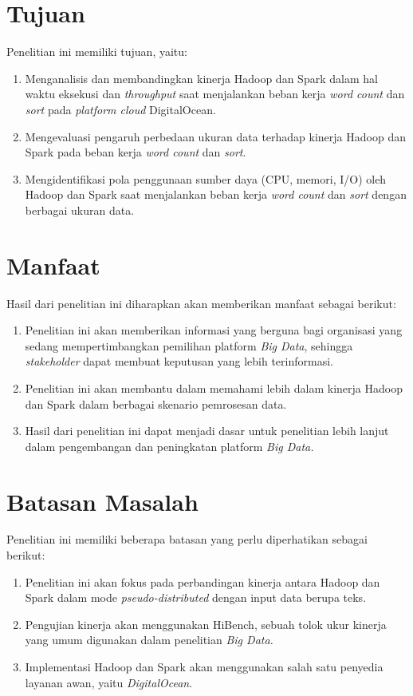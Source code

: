 \section{Tujuan}
Penelitian ini memiliki tujuan, yaitu:
\begin{enumerate}
\item Menganalisis dan membandingkan kinerja Hadoop dan Spark dalam hal waktu eksekusi dan \textit{throughput} saat menjalankan beban kerja \textit{word count} dan \textit{sort} pada \textit{platform cloud} DigitalOcean.
\item Mengevaluasi pengaruh perbedaan ukuran data terhadap kinerja Hadoop dan Spark pada beban kerja \textit{word count} dan \textit{sort}.
\item Mengidentifikasi pola penggunaan sumber daya (CPU, memori, I/O) oleh Hadoop dan Spark saat menjalankan beban kerja \textit{word count} dan \textit{sort} dengan berbagai ukuran data.
\end{enumerate}

\section{Manfaat}
Hasil dari penelitian ini diharapkan akan memberikan manfaat sebagai berikut:
\begin{enumerate}
	\item 
	Penelitian ini akan memberikan informasi yang berguna bagi organisasi yang sedang mempertimbangkan pemilihan platform \textit{Big Data}, sehingga \textit{stakeholder} dapat membuat keputusan yang lebih terinformasi.	
	\item
	Penelitian ini akan membantu dalam memahami lebih dalam kinerja Hadoop dan Spark dalam berbagai skenario pemrosesan data.
	\item
	Hasil dari penelitian ini dapat menjadi dasar untuk penelitian lebih lanjut dalam pengembangan dan peningkatan platform \textit{Big Data.}
\end{enumerate}

\section{Batasan Masalah}
Penelitian ini memiliki beberapa batasan yang perlu diperhatikan sebagai berikut:
	\begin{enumerate}
		\item 
		Penelitian ini akan fokus pada perbandingan kinerja antara Hadoop dan Spark dalam mode \textit{pseudo-distributed} dengan input data berupa teks.
		\item
		Pengujian kinerja akan menggunakan HiBench, sebuah tolok ukur kinerja yang umum digunakan dalam penelitian \textit{Big Data.}
		\item
		Implementasi Hadoop dan Spark akan menggunakan salah satu penyedia layanan awan, yaitu \textit{DigitalOcean}.
	\end{enumerate}

